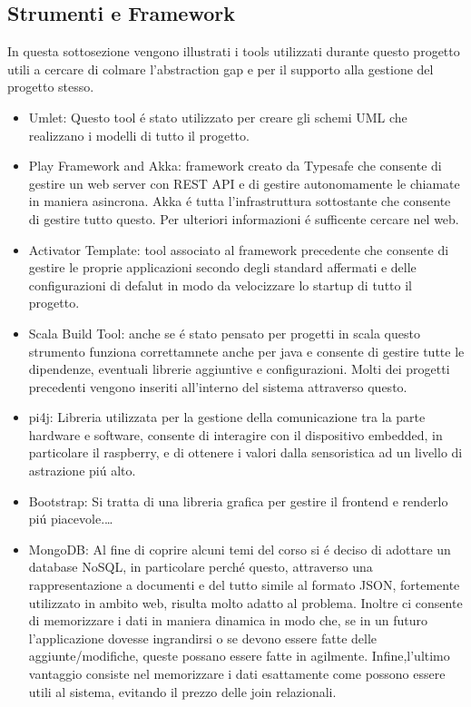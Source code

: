\subsection{Strumenti e Framework}

In questa sottosezione vengono illustrati i tools utilizzati durante questo progetto utili a cercare di colmare l'abstraction gap e per il supporto alla gestione del progetto stesso.

\begin{itemize}
 \item{Umlet:} Questo tool \'e stato utilizzato per creare gli schemi UML che realizzano i modelli di tutto il progetto.\cite{Umlet}
 \item {Play Framework and Akka:} framework creato da Typesafe che consente di gestire un web server con REST API e di gestire autonomamente le chiamate in maniera asincrona. Akka \'e tutta l'infrastruttura sottostante che consente di gestire tutto questo. Per ulteriori informazioni \'e sufficente cercare nel web.\cite{Akka,PlayFramework}
 \item {Activator Template:} tool associato al framework precedente che consente di gestire le proprie applicazioni secondo degli standard affermati e delle configurazioni di defalut in modo da velocizzare lo startup di tutto il progetto.\cite{Activator&SBT}
 \item {Scala Build Tool:} anche se \'e stato pensato per progetti in scala questo strumento funziona correttamnete anche per java e consente di gestire tutte le dipendenze, eventuali librerie aggiuntive e configurazioni. Molti dei progetti precedenti vengono inseriti all'interno del sistema attraverso questo.\cite{Activator&SBT}
 \item {pi4j:} Libreria utilizzata per la gestione della comunicazione tra la parte hardware e software, consente di interagire con il dispositivo embedded, in particolare il raspberry, e di ottenere i valori dalla sensoristica ad un livello di astrazione pi\'u alto. \cite{Pi4J}
 \item {Bootstrap:} Si tratta di una libreria grafica per gestire il frontend e renderlo pi\'u piacevole.\ldots
 \item {MongoDB:} Al fine di coprire alcuni temi del corso si \'e deciso di adottare un database NoSQL, in particolare perch\'e questo, attraverso una rappresentazione a documenti e del tutto simile al formato JSON, fortemente utilizzato in ambito web, risulta molto adatto al problema. Inoltre ci consente di memorizzare i dati in maniera dinamica in modo che, se in un futuro l'applicazione dovesse ingrandirsi o se devono essere fatte delle aggiunte/modifiche, queste possano essere fatte in agilmente. Infine,l'ultimo vantaggio consiste nel memorizzare i dati esattamente come possono essere utili al sistema, evitando il prezzo delle join relazionali. \cite{MongoDB}

\end{itemize}
